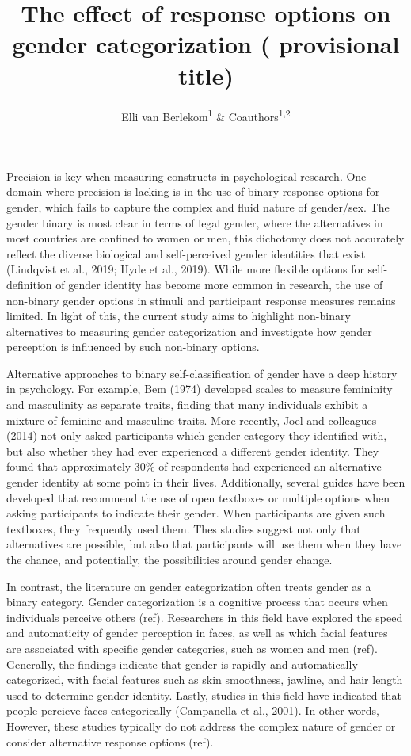 \documentclass[
  man]{apa7}
\title{The effect of response options on gender categorization ( provisional title)}
\author{Elli van Berlekom\textsuperscript{1} \& Coauthors\textsuperscript{1,2}}
\date{}
\affiliation{\vspace{0.5cm}\textsuperscript{1} Stockholm University\\\textsuperscript{2} Lund University}
\begin{document}
\maketitle

Precision is key when measuring constructs in psychological research. One domain where precision is lacking is in the use of binary response options for gender, which fails to capture the complex and fluid nature of gender/sex. The gender binary is most clear in terms of legal gender, where the alternatives in most countries are confined to women or men, this dichotomy does not accurately reflect the diverse biological and self-perceived gender identities that exist (Lindqvist et al., 2019; Hyde et al., 2019). While more flexible options for self-definition of gender identity has become more common in research, the use of non-binary gender options in stimuli and participant response measures remains limited. In light of this, the current study aims to highlight non-binary alternatives to measuring gender categorization and investigate how gender perception is influenced by such non-binary options.

Alternative approaches to binary self-classification of gender have a deep history in psychology. For example, Bem (1974) developed scales to measure femininity and masculinity as separate traits, finding that many individuals exhibit a mixture of feminine and masculine traits. More recently, Joel and colleagues (2014) not only asked participants which gender category they identified with, but also whether they had ever experienced a different gender identity. They found that approximately 30\% of respondents had experienced an alternative gender identity at some point in their lives. Additionally, several guides have been developed that recommend the use of open textboxes or multiple options when asking participants to indicate their gender. When participants are given such textboxes, they frequently used them. Thes studies suggest not only that alternatives are possible, but also that participants will use them when they have the chance, and potentially, the possibilities around gender change.

In contrast, the literature on gender categorization often treats gender as a binary category. Gender categorization is a cognitive process that occurs when individuals perceive others (ref). Researchers in this field have explored the speed and automaticity of gender perception in faces, as well as which facial features are associated with specific gender categories, such as women and men (ref). Generally, the findings indicate that gender is rapidly and automatically categorized, with facial features such as skin smoothness, jawline, and hair length used to determine gender identity. Lastly, studies in this field have indicated that people percieve faces categorically (Campanella et al., 2001). In other words, However, these studies typically do not address the complex nature of gender or consider alternative response options (ref).
\end{document}
